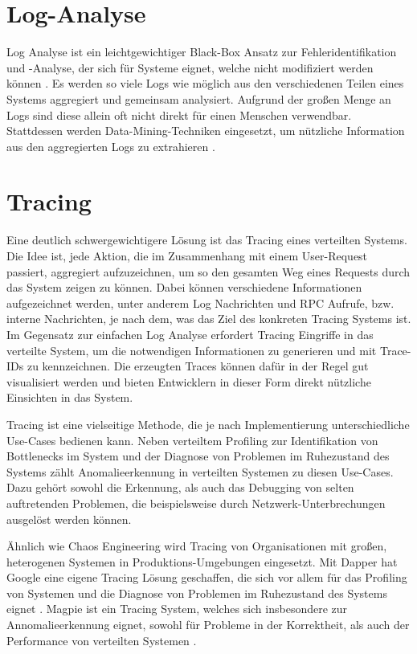 \documentclass[12pt,a4paper]{report}
\begin{document}
\section{Log-Analyse}
Log Analyse ist ein leichtgewichtiger Black-Box Ansatz zur Fehleridentifikation und -Analyse, der sich für Systeme eignet, welche
nicht modifiziert werden können \cite{challenges_and_options}. Es werden so viele Logs wie möglich aus den
verschiedenen Teilen eines Systems aggregiert und gemeinsam analysiert. Aufgrund der großen Menge an Logs sind diese allein oft
nicht direkt für einen Menschen verwendbar. Stattdessen werden Data-Mining-Techniken eingesetzt, um nützliche Information aus den
aggregierten Logs zu extrahieren \cite{log_analysis_at_google}.

\section{Tracing}
Eine deutlich schwergewichtigere Lösung ist das Tracing eines verteilten Systems. Die Idee ist, jede Aktion, die im Zusammenhang
mit einem User-Request passiert, aggregiert aufzuzeichnen, um so den gesamten Weg eines Requests durch das System zeigen zu können.
Dabei können verschiedene Informationen aufgezeichnet werden, unter anderem Log Nachrichten und RPC Aufrufe, bzw. interne
Nachrichten, je nach dem, was das Ziel des konkreten Tracing Systems ist. Im Gegensatz zur einfachen Log Analyse erfordert Tracing
Eingriffe in das verteilte System, um die notwendigen Informationen zu generieren und mit Trace-IDs zu kennzeichnen. Die erzeugten
Traces können dafür in der Regel gut visualisiert werden und bieten Entwicklern in dieser Form direkt nützliche Einsichten in das
System. \cite{dapper_tracing}

Tracing ist eine vielseitige Methode, die je nach Implementierung unterschiedliche Use-Cases bedienen kann. Neben verteiltem
Profiling zur Identifikation von Bottlenecks im System und der Diagnose von Problemen im Ruhezustand des Systems zählt
Anomalieerkennung in verteilten Systemen zu diesen Use-Cases. Dazu gehört sowohl die Erkennung, als auch das Debugging von selten
auftretenden Problemen, die beispielsweise durch Netzwerk-Unterbrechungen ausgelöst werden können. \cite{so_you_want_to_trace}

Ähnlich wie Chaos Engineering wird Tracing von Organisationen mit großen, heterogenen Systemen in Produktions-Umgebungen
eingesetzt. Mit Dapper \cite{dapper_tracing} hat Google eine eigene Tracing Lösung geschaffen, die sich vor allem für das
Profiling von Systemen und die Diagnose von Problemen im Ruhezustand des Systems eignet \cite{so_you_want_to_trace}. Magpie
\cite{magpie_tracing} ist ein Tracing System, welches sich insbesondere zur Annomalieerkennung eignet, sowohl für Probleme in der
Korrektheit, als auch der Performance von verteilten Systemen \cite{so_you_want_to_trace}.
\end{document}
